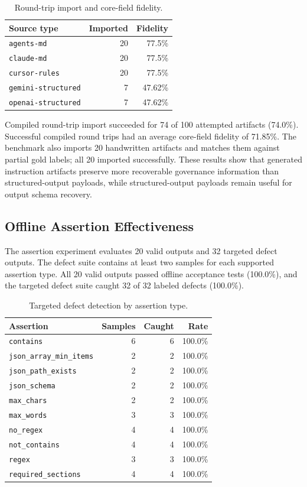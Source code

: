 \documentclass[11pt]{article}
\begin{document}
\begin{table}[htbp]
\caption{Round-trip import and core-field fidelity.}
\label{tab:roundtrip}
\centering
\begin{tabular}{lrr}
\toprule
Source type & Imported & Fidelity \\
\midrule
\texttt{agents-md} & 20 & 77.5\% \\
\texttt{claude-md} & 20 & 77.5\% \\
\texttt{cursor-rules} & 20 & 77.5\% \\
\texttt{gemini-structured} & 7 & 47.62\% \\
\texttt{openai-structured} & 7 & 47.62\% \\
\bottomrule
\end{tabular}
\end{table}

Compiled round-trip import succeeded for 74 of 100 attempted artifacts (74.0\%).
Successful compiled round trips had an average core-field fidelity of 71.85\%. The
benchmark also imports 20 handwritten artifacts and matches them against partial gold
labels; all 20 imported successfully. These results show that generated instruction
artifacts preserve more recoverable governance information than structured-output
payloads, while structured-output payloads remain useful for output schema recovery.

\subsection{Offline Assertion Effectiveness}

The assertion experiment evaluates 20 valid outputs and 32 targeted defect outputs.
The defect suite contains at least two samples for each supported assertion type.
All 20 valid outputs passed offline acceptance tests (100.0\%), and the targeted
defect suite caught 32 of 32 labeled defects (100.0\%).

\begin{table}[htbp]
\caption{Targeted defect detection by assertion type.}
\label{tab:assertions}
\centering
\begin{tabular}{lrrr}
\toprule
Assertion & Samples & Caught & Rate \\
\midrule
\texttt{contains} & 6 & 6 & 100.0\% \\
\texttt{json\_array\_min\_items} & 2 & 2 & 100.0\% \\
\texttt{json\_path\_exists} & 2 & 2 & 100.0\% \\
\texttt{json\_schema} & 2 & 2 & 100.0\% \\
\texttt{max\_chars} & 2 & 2 & 100.0\% \\
\texttt{max\_words} & 3 & 3 & 100.0\% \\
\texttt{no\_regex} & 4 & 4 & 100.0\% \\
\texttt{not\_contains} & 4 & 4 & 100.0\% \\
\texttt{regex} & 3 & 3 & 100.0\% \\
\texttt{required\_sections} & 4 & 4 & 100.0\% \\
\bottomrule
\end{tabular}
\end{table}
\end{document}
